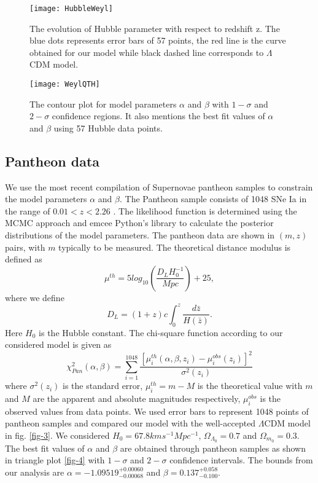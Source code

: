 
\begin{figure}[H]
\centering
\texttt{[image: HubbleWeyl]}
\caption{The evolution of Hubble parameter with respect to redshift z. The blue dots represents error bars of 57 points, the red line is the curve obtained for our model while black dashed line corresponds to $\Lambda$CDM model. }
\label{fig-1}
\end{figure}

\begin{figure}[H]
\centering
\texttt{[image: WeylQTH]}
\caption{The contour plot for model parameters $\alpha$ and $\beta$ with $1-\sigma$ and $2-\sigma$ confidence regions. It also mentions the best fit values of $\alpha$ and $\beta$ using 57 Hubble data points.}
\label{fig-2}
\end{figure}

\subsection{Pantheon data}

We use the most recent compilation of Supernovae pantheon samples to constrain the model parameters $\alpha$ and $\beta$. The Pantheon sample consists of 1048 SNe Ia in the range of $0.01<z<2.26$ \cite{Camlibel/2020,Scolnic/2018}. The likelihood function is determined using the MCMC approach and emcee Python's library to calculate the posterior distributions of the model parameters. The pantheon data are shown in $(m, z)$ pairs, with $m$ typically to be measured. 
The theoretical distance modulus is defined as 
\begin{equation}
\mu^{th}= 5 log_{10} \left( \frac{D_{L} H_{0}^{-1}}{Mpc}\right)  +25,
\end{equation}
where we define
\begin{equation}
D_{L}= (1+z) c \int_{0}^{z} \frac{d\bar{z}}{H(\bar{z}) }.
\end{equation}
Here $H_{0}$ is the Hubble constant. The chi-square function according to our considered model is given as 
\begin{equation}
\chi^{2}_{Pan}(\alpha,\beta)= \sum_{i=1}^{1048} \dfrac{\left[ \mu^{th}_{i}(\alpha,\beta,z_{i})-\mu^{obs}_{i}(z_{i})\right]^{2} }{\sigma^{2}(z_{i})}
\end{equation}
where $\sigma^{2}(z_{i})$ is the standard error, $\mu^{th}_{i}= m-M$ is the theoretical value with $m$ and $M$ are the apparent and absolute magnitudes respectively, $\mu^{obs}_{i}$ is the observed values from data points.
We used error bars to represent 1048 points of pantheon samples and compared our model with the well-accepted $\Lambda$CDM model in fig. \ref{fig-3}. We considered $H_{0}=67.8 km s^{-1} Mpc^{-1}$, $\Omega_{\Lambda_{0}}=0.7$ and $\Omega_{m_{0}}=0.3$. The best fit values of $\alpha$ and $\beta$ are obtained through pantheon samples as shown in triangle plot \ref{fig-4} with $1-\sigma$ and $2-\sigma$ confidence intervals. The bounds from our analysis are $\alpha=-1.09519^{+0.00060}_{-0.00068}$ and $\beta=0.137^{+0.058}_{-0.100}$.


